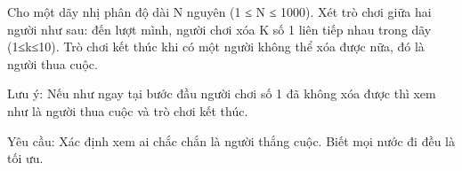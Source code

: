Cho một dãy nhị phân độ dài N nguyên (1 ≤ N ≤ 1000). Xét trò chơi giữa hai người như sau: đến lượt mình, người chơi xóa K số 1 liên tiếp nhau trong dãy (1≤k≤10). Trò chơi kết thúc khi có một người không thể xóa được nữa, đó là người thua cuộc.

Lưu ý: Nếu như ngay tại bước đầu người chơi số 1 đã không xóa được thì xem như là người thua cuộc và trò chơi kết thúc.

Yêu cầu: Xác định xem ai chắc chắn là người thắng cuộc. Biết mọi nước đi đều là tối ưu.

\